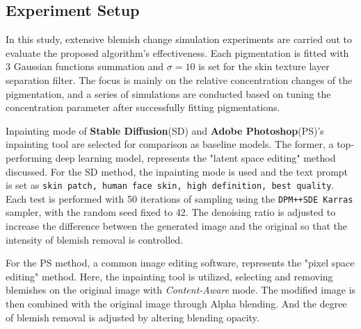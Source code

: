 \begin{spacing}{1.5}
\section{Experiment Setup}
In this study, extensive blemish change simulation experiments are carried out to evaluate the proposed algorithm's effectiveness. Each pigmentation is fitted with 3 Gaussian functions summation and $\sigma=10$ is set for the skin texture layer separation filter. The focus is mainly on the relative concentration changes of the pigmentation, and a series of simulations are conducted based on tuning the concentration parameter after successfully fitting pigmentations.

Inpainting mode of \textbf{Stable Diffusion}(SD)\cite{rombach2021highresolution} and \textbf{Adobe Photoshop}(PS)'s inpainting tool\cite{adobephotoshop} are selected for comparison as baseline models. The former, a top-performing deep learning model, represents the "latent space editing" method discussed. For the SD method, the inpainting mode is used and the text prompt is set as \texttt{skin patch, human face skin, high definition, best quality}. Each test is performed with 50 iterations of sampling using the \texttt{DPM++SDE Karras} sampler, with the random seed fixed to 42. The denoising ratio is adjusted to increase the difference between the generated image and the original so that the intensity of blemish removal is controlled. 

For the PS method, a common image editing software, represents the "pixel space editing" method. Here, the inpainting tool is utilized, selecting and removing blemishes on the original image with \textit{Content-Aware} mode. The modified image is then combined with the original image through Alpha blending. And the degree of blemish removal is adjusted by altering blending opacity.


\end{spacing}
